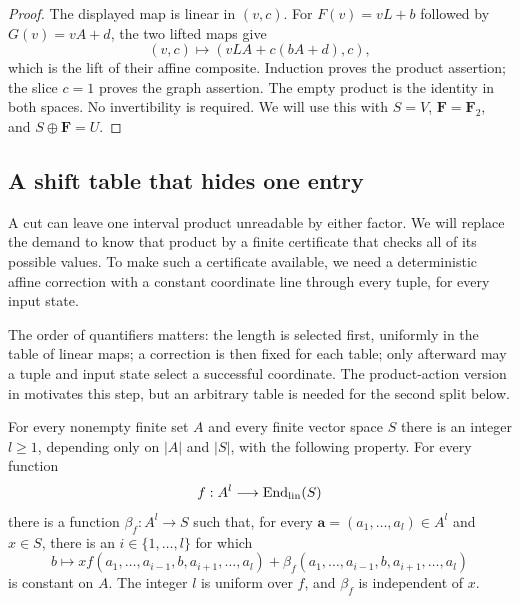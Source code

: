 \begin{proof}
The displayed map is linear in $(v,c)$. For
$F(v)=vL+b$ followed by $G(v)=vA+d$, the two lifted maps give
\[
            (v,c)\longmapsto(vLA+c(bA+d),c),
\]
which is the lift of their affine composite. Induction proves the
product assertion; the slice $c=1$ proves the graph assertion. The
empty product is the identity in both spaces. No invertibility is
required. We will use this with $S=V$, $\mathbf F=\mathbf F_2$, and
$S\oplus\mathbf F=U$.
\end{proof}

\subsection{A shift table that hides one entry}

A cut can leave one interval product unreadable by either factor. We
will replace the demand to know that product by a finite certificate that
checks all of its possible values. To make such a certificate available,
we need a deterministic affine correction with a constant coordinate
line through every tuple, for every input state.

The order of quantifiers matters: the length is selected first, uniformly
in the table of linear maps; a correction is then fixed for each table;
only afterward may a tuple and input state select a successful coordinate.
The product-action version in \cite[Lemma~2.3]{HeightFour} motivates this
step, but an arbitrary table is needed for the second split below.

\begin{lemma}\label{alg:shift-table}
For every nonempty finite set $A$ and every finite vector space $S$
there is an integer $l\ge1$, depending only on $|A|$ and $|S|$, with
the following property. For every function
\[
                    f:A^l\longrightarrow
                                    \operatorname{End}_{\rm lin}(S)
\]
there is a function $\beta_f:A^l\to S$ such that, for every
$\mathbf a=(a_1,\ldots,a_l)\in A^l$ and $x\in S$, there is an
$i\in\{1,\ldots,l\}$ for which
\begin{equation}\label{alg:shift-constancy}
 b\longmapsto x f(a_1,\ldots,a_{i-1},b,a_{i+1},\ldots,a_l)
       +\beta_f(a_1,\ldots,a_{i-1},b,a_{i+1},\ldots,a_l)
\end{equation}
is constant on $A$. The integer $l$ is uniform over $f$, and
$\beta_f$ is independent of $x$.
\end{lemma}

